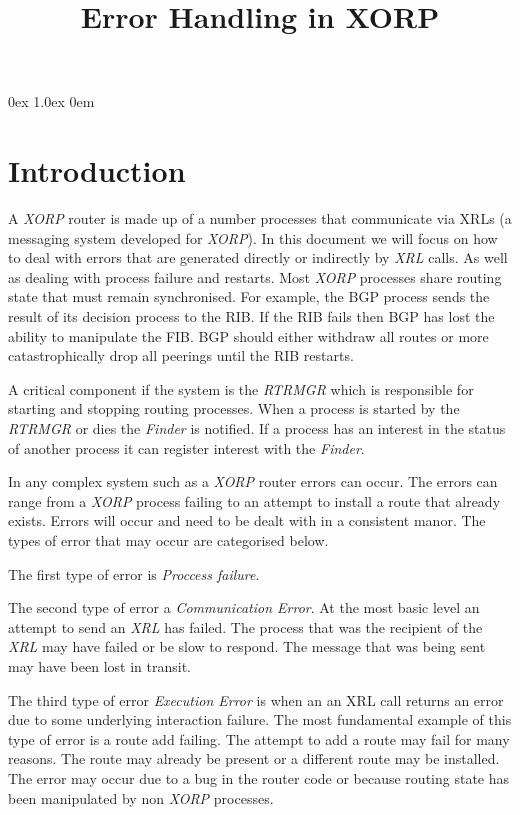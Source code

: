 \documentclass[11pt]{article}
\title{Error Handling in XORP}
\makeatletter
\newcommand{\xorp} {{\em XORP}\@\xspace}
\newcommand{\finder} {{\em Finder}\@\xspace}
\newcommand{\xrl} {{\em XRL}\@\xspace}
\newcommand{\rtrmgr} {{\em RTRMGR}\@\xspace}
\makeatother
\begin{document}
\parsep 0ex
\parskip 1.0ex
\parindent 0em
\noindent
\maketitle                            
\section{Introduction}

A \xorp router is made up of a number processes that communicate via
XRLs \cite{xorp:xrl} (a messaging system developed for \xorp). In this
document we will focus on how to deal with errors that are generated
directly or indirectly by \xrl calls. As well as dealing with process
failure and restarts. Most \xorp processes share routing state that
must remain synchronised. For example, the BGP process sends the
result of its decision process to the RIB. If the RIB fails then BGP
has lost the ability to manipulate the FIB. BGP should either withdraw
all routes or more catastrophically drop all peerings until the RIB
restarts.

A critical component if the system is the \rtrmgr which is responsible
for starting and stopping routing processes. When a process is started
by the \rtrmgr or dies the \finder is notified. If a process has an
interest in the status of another process it can register interest
with the \finder.

In any complex system such as a \xorp router errors can occur. The
errors can range from a \xorp process failing to an attempt to install
a route that already exists. Errors will occur and need to be dealt
with in a consistent manor. The types of error that may occur are
categorised below.

The first type of error is {\em Proccess failure}.

The second type of error a {\em Communication Error}. At the most
basic level an attempt to send an \xrl has failed. The process that
was the recipient of the \xrl may have failed or be slow to respond.
The message that was being sent may have been lost in transit.

The third type of error {\em Execution Error} is when an an XRL call
returns an error due to some underlying interaction failure. The most
fundamental example of this type of error is a route add failing. The
attempt to add a route may fail for many reasons. The route may
already be present or a different route may be installed. The error
may occur due to a bug in the router code or because routing state has
been manipulated by non \xorp processes.
\end{document}
